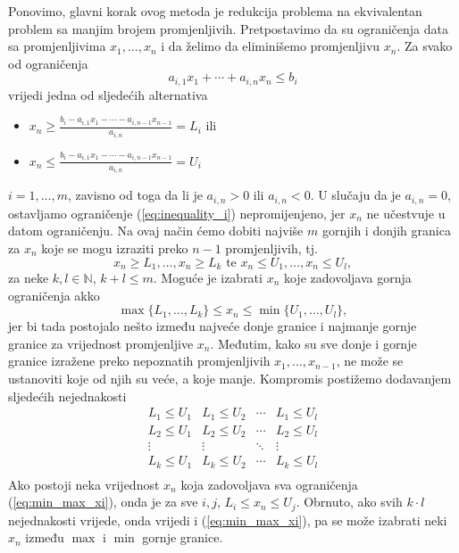 \documentclass[b5paper, utf8, 11pt, colorlinks]{book}
\theoremstyle{definition}
\begin{document}
Ponovimo, glavni korak ovog metoda je redukcija problema na ekvivalentan problem sa manjim brojem promjenljivih. Pretpostavimo da su ograničenja data sa promjenljivima $x_1,\ldots, x_n$ i da želimo da eliminišemo promjenljivu $x_n$. Za svako od ograničenja
\begin{equation}\label{eq:inequality_i}
	a_{i,1} x_1 + \cdots + a_{i,n} x_n \leq b_i
\end{equation}
vrijedi jedna od sljedećih alternativa 
\begin{itemize}
	\item  $x_n \geq \frac{b_i - a_{i,1}x_1- \cdots - a_{i, n-1} x_{n-1} }{a_{i,n}}=L_i$ ili 
	\item   $x_n \leq \frac{b_i - a_{i,1}x_1- \cdots - a_{i, n-1} x_{n-1} }{a_{i,n}}=U_i$
\end{itemize}
$i=1,\ldots, m$, zavisno od toga da li je $a_{i,n} >0$ ili $a_{i,n} <0$. U slučaju da je $a_{i,n} = 0$,  ostavljamo  ograničenje (\ref{eq:inequality_i}) nepromijenjeno, jer   $x_n$  ne učestvuje u datom ograničenju. Na ovaj način ćemo dobiti najviše $m$ gornjih i donjih granica za $x_n$ koje se mogu izraziti preko $n-1$ promjenljivih, tj. 
$$  x_n \geq L_1, \ldots, x_n\geq L_k \mbox{ te }  x_n \leq U_1, \ldots, x_n \leq U_l,$$
za neke $k,l \in \mathbb{N}$, $k+l \leq m$.
Moguće je izabrati $x_n$ koje zadovoljava gornja ograničenja akko 
\begin{equation}\label{eq:min_max_xi}
	\max\{L_1,\ldots, L_k \} \leq x_n \leq \min \{ U_1, \ldots, U_l \},
\end{equation}
jer bi tada postojalo nešto između najveće donje granice i najmanje gornje granice za vrijednost promjenljive $x_n$. Međutim, kako su sve donje i gornje granice izražene preko nepoznatih promjenljivih $x_1, \ldots, x_{n-1}$, ne može se ustanoviti koje od njih su veće, a koje manje. Kompromis postižemo dodavanjem  sljedećih nejednakosti 
$$\begin{array}{cccc}
	L_1 \leq U_1 & L_1 \leq U_2   &  \cdots   & L_1 \leq U_l \\
	L_2 \leq U_1 & L_2  \leq U_2  &  \cdots   & L_2 \leq U_l \\
	\vdots       &     \vdots     &   \ddots  & \vdots       \\
	L_k \leq U_1 &  L_k \leq U_2  &   \cdots  & L_k \leq U_l \\
\end{array}$$ 
Ako postoji neka vrijednost  $x_n$ koja zadovoljava sva ograničenja (\ref{eq:min_max_xi}), onda je za sve $i,j$, 
$L_i \leq x_n \leq U_j$. Obrnuto, ako svih $k \cdot l$ nejednakosti vrijede, onda vrijedi i (\ref{eq:min_max_xi}), pa se može izabrati neki $x_n$ između $\max$ i $\min$ gornje granice. 
\end{document}
